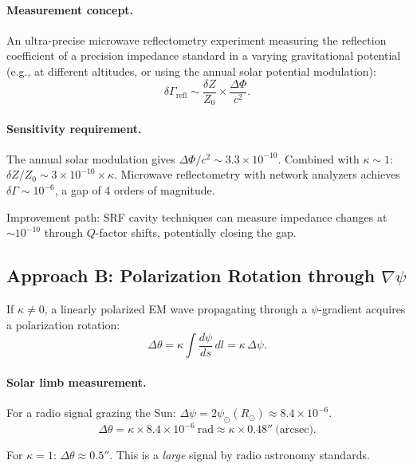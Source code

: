 \documentclass[11pt]{article}
\newcommand{\ee}[1]{\times 10^{#1}}
\begin{document}
\paragraph{Measurement concept.}
An ultra-precise microwave reflectometry experiment measuring the
reflection coefficient of a precision impedance standard in a
varying gravitational potential (e.g., at different altitudes, or
using the annual solar potential modulation):
\begin{equation}
\delta\Gamma_{\text{refl}} \sim \frac{\delta Z}{Z_0}
\times \frac{\Delta\Phi}{c^2}.
\end{equation}

\paragraph{Sensitivity requirement.}
The annual solar modulation gives $\Delta\Phi/c^2 \sim 3.3\ee{-10}$.
Combined with $\kappa \sim 1$: $\delta Z/Z_0 \sim 3\ee{-10} \times
\kappa$.  Microwave reflectometry with network analyzers achieves
$\delta\Gamma \sim 10^{-6}$, a gap of 4 orders of magnitude.

Improvement path: SRF cavity techniques can measure impedance
changes at $\sim 10^{-10}$ through $Q$-factor shifts, potentially
closing the gap.

\subsection{Approach B: Polarization Rotation through $\nabla\psi$}

If $\kappa \neq 0$, a linearly polarized EM wave propagating through
a $\psi$-gradient acquires a polarization rotation:
\begin{equation}
\Delta\theta = \kappa \int \frac{d\psi}{ds}\, dl
= \kappa\,\Delta\psi.
\end{equation}

\paragraph{Solar limb measurement.}
For a radio signal grazing the Sun:
$\Delta\psi = 2\psi_\odot(R_\odot) \approx 8.4\ee{-6}$.
\begin{equation}
\Delta\theta = \kappa \times 8.4\ee{-6}~\text{rad}
\approx \kappa \times 0.48''~\text{(arcsec)}.
\end{equation}

For $\kappa = 1$: $\Delta\theta \approx 0.5''$.  This is a
\textit{large} signal by radio astronomy standards.
\end{document}
